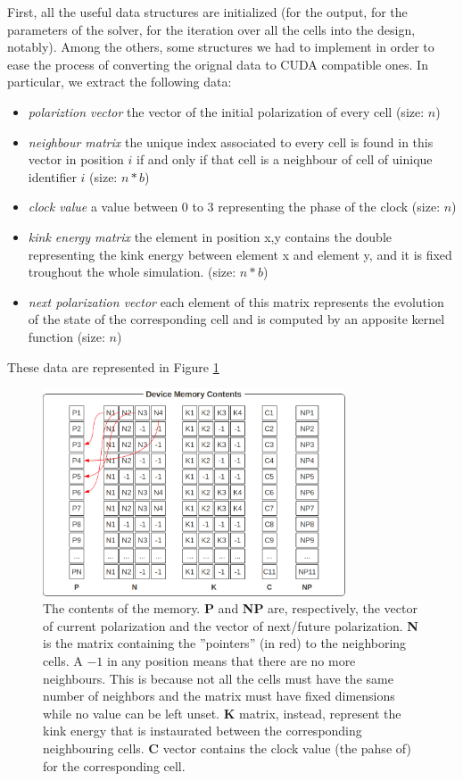 First, all the useful data structures are initialized (for the output, for the parameters of the solver, for the iteration over all the cells into the design, notably). Among the others, some structures we had to implement in order to ease the process of converting the orignal data to CUDA compatible ones. In particular, we extract the following data:
\begin{itemize}
\item \textsl{polariztion vector} the vector of the initial polarization of every cell  (size: $n$)
\item \textsl{neighbour matrix} the unique index associated to every cell is found in this vector in position $i$ if and only if that cell is a neighbour of cell of uinique identifier $i$  (size: $n*b$)
\item \textsl{clock value} a value between 0 to 3 representing the phase of the clock (size: $n$)
\item \textsl{kink energy matrix} the element in position x,y contains the double representing the kink energy between element x and element y, and it is fixed troughout the whole simulation. (size: $n*b$)
\item \textsl{next polarization vector} each element of this matrix represents the evolution of the state of the corresponding cell and is computed by an apposite kernel function (size: $n$)
\end{itemize}
These data are represented in Figure \ref{fig:impdetmem}

\begin{figure}[h!bt]
	\centerline{\includegraphics[width=0.8\textwidth]{img/impdetmem.png}}
	\caption{The contents of the memory. \textbf{P} and \textbf{NP} are, respectively, the vector of current polarization and the vector of next/future polarization. \textbf{N} is the matrix containing the ''pointers'' (in red) to the neighboring cells. A $-1$ in any position means that there are no more neighbours. This is because not all the cells must have the same number of neighbors and the matrix must have fixed dimensions while no value can be left unset. \textbf{K} matrix, instead, represent the kink energy that is instaurated between the corresponding neighbouring cells. \textbf{C} vector contains the clock value (the pahse of) for the corresponding cell.}
	\label{fig:impdetmem}
\end{figure}

